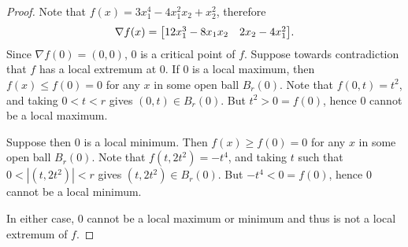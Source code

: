 \documentclass{eeleyes}
\begin{document}
\begin{proof}
    Note that $f(x) = 3 x_1^4 - 4 x_1^2 x_2 + x_2^2$, therefore 
    \[
        \nabla f(x) = \mqty[ 12 x_1^3  - 8 x_1 x_2 & 2 x_2 - 4 x_1^2]
    .\]
    Since $\nabla f(0) = (0 , 0)$, $0$ is a critical point of $f$. Suppose towards contradiction that $f$ has a local extremum at $0$. If $0$ is a local maximum, then $f(x) \leq f(0) = 0$ for any $x$ in some open ball $B_r(0)$. Note that $f(0,t) = t^2$, and taking $0 < t < r$ gives $(0,t) \in B_r(0)$. But $t^2 > 0 = f(0)$, hence $0$ cannot be a local maximum.

    Suppose then $0$ is a local minimum. Then $f(x) \geq f(0) = 0$ for any $x$ in some open ball $B_r(0)$. Note that $f(t, 2t^2) = -t^4$, and taking $t$ such that $0 < |(t, 2t^2)| < r$ gives $(t, 2t^2) \in B_r(0)$. But $-t^4 < 0 = f(0)$, hence $0$ cannot be a local minimum.
    
    In either case, $0$ cannot be a local maximum or minimum and thus is not a local extremum of $f$.
\end{proof}
\end{document}
